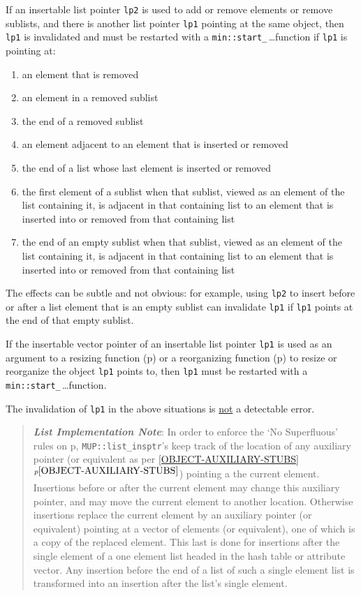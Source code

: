 \documentclass[12pt]{article}
\newcommand{\key}[1]{{\bf \em #1}\index{#1}}
\newcommand{\itemref}[1]{\ref{#1}$^{p\pageref{#1}}$}
\newcommand{\pagref}[1]{p\pageref{#1}}
\newcommand{\EOL}{\penalty \exhyphenpenalty}
\begin{document}
If an insertable list pointer {\tt lp2} is used to add or remove
elements or remove sublists, and there is another list pointer {\tt lp1}
pointing at the same object, then {\tt lp1} is invalidated and must
be restarted with a
{\tt min::\EOL start\_}\,\ldots function\label{RESTARTING_LIST_PTR}
if {\tt lp1} is pointing at:

\begin{enumerate}
\item an element that is removed
\item an element in a removed sublist
\item the end of a removed sublist
\item an element adjacent to an element that is inserted or removed
\item the end of a list whose last element is inserted or removed
\item the first element of a sublist
      when that sublist, viewed as an element of the list containing
      it, is adjacent in that containing list to
      an element that is inserted into or removed from that containing list
\item the end of an empty sublist
      when that sublist, viewed as an element of the list containing
      it, is adjacent in that containing list to
      an element that is inserted into or removed from that containing list
\end{enumerate}

The effects can be subtle
and not obvious: for example, using {\tt lp2} to insert before or after
a list element that is an empty sublist can invalidate {\tt lp1}
if {\tt lp1} points at the end of that empty sublist.

If the insertable vector pointer of an insertable list pointer
{\tt lp1} is used as an argument to
a resizing function (\pagref{RESIZING-FUNCTIONS}) or
a reorganizing function (\pagref{REORGANIZING-FUNCTIONS}) to resize
or reorganize the object {\tt lp1} points to, then
{\tt lp1} must be restarted with a
{\tt min::\EOL start\_}\,\ldots function.

The invalidation of {\tt lp1} in the above situations
is \underline{not} a detectable error.

\begin{quote}
\key{List Implementation Note}:\label{LIST-IMPLEMENTATION-NOTE}
In order to enforce the `No Superfluous' rules on 
\pagref{NO-SUPERFLUOUS-LIST}, {\tt MUP::list\_insptr}'s keep
track of the location of any auxiliary pointer
(or equivalent as per \itemref{OBJECT-AUXILIARY-STUBS})
pointing a the current
element.  Insertions before or after the current element may change
this auxiliary pointer, and may move the current element to another
location.  Otherwise insertions replace the current element
by an auxiliary pointer (or equivalent)
pointing at a vector of elements (or equivalent),
one of which is a copy of the replaced element.
This last is done for insertions after the single element of a one
element list headed in the hash table or attribute vector.
Any insertion before the end of a list of such a single element list
is transformed into an insertion after the list's single element.
\end{quote}
\end{document}
